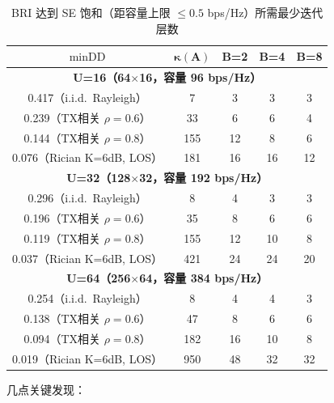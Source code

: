 \documentclass{CjC}
\begin{document}
    \begin{table}[H]
        \centering
        \caption{BRI 达到 SE 饱和（距容量上限 $\le0.5$ bps/Hz）所需最少迭代层数}
        \label{tab:bri-convergence} \small
        \begin{tabular}{c c c c c}
            \toprule $\operatorname{minDD}$ & $\bm{\kappa(\bm{A})}$ & \textbf{B=2} & \textbf{B=4} & \textbf{B=8} \\
            \midrule \multicolumn{5}{c}{\textbf{U=16（64$\times$16，容量 96 bps/Hz）}}   \\
            \midrule 0.417（i.i.d.\ Rayleigh）  & 7   & 3  & 3  & 3            \\
0.239（TX相关 $\rho=0.6$）  & 33  & 6  & 6  & 4            \\
0.144（TX相关 $\rho=0.8$）  & 155 & 12 & 8  & 6            \\
0.076（Rician K=6dB, LOS）  & 181 & 16 & 16 & 12           \\
            \midrule \multicolumn{5}{c}{\textbf{U=32（128$\times$32，容量 192 bps/Hz）}} \\
            \midrule 0.296（i.i.d.\ Rayleigh）  & 8   & 4  & 3  & 3            \\
0.196（TX相关 $\rho=0.6$）  & 35  & 8  & 6  & 6            \\
0.119（TX相关 $\rho=0.8$）  & 155 & 12 & 10 & 8            \\
0.037（Rician K=6dB, LOS）  & 421 & 24 & 24 & 20           \\
            \midrule \multicolumn{5}{c}{\textbf{U=64（256$\times$64，容量 384 bps/Hz）}} \\
            \midrule 0.254（i.i.d.\ Rayleigh）  & 8   & 4  & 4  & 3            \\
0.138（TX相关 $\rho=0.6$）  & 47  & 8  & 6  & 6            \\
0.094（TX相关 $\rho=0.8$）  & 182 & 16 & 10 & 8            \\
0.019（Rician K=6dB, LOS）  & 950 & 48 & 32 & 32           \\
            \bottomrule
        \end{tabular}
    \end{table}

    几点关键发现：
\end{document}
